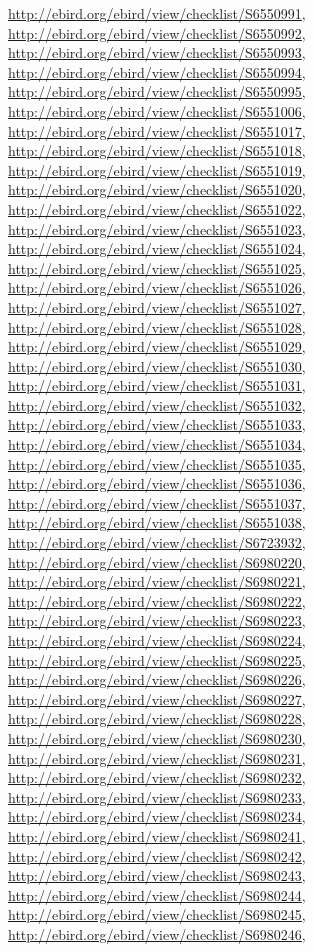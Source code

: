 \documentclass[9pt, article]{memoir}
\begin{document}
\begin{multicols}{2}
\url{http://ebird.org/ebird/view/checklist/S6550991}, 
\url{http://ebird.org/ebird/view/checklist/S6550992}, 
\url{http://ebird.org/ebird/view/checklist/S6550993}, 
\url{http://ebird.org/ebird/view/checklist/S6550994}, 
\url{http://ebird.org/ebird/view/checklist/S6550995}, 
\url{http://ebird.org/ebird/view/checklist/S6551006}, 
\url{http://ebird.org/ebird/view/checklist/S6551017}, 
\url{http://ebird.org/ebird/view/checklist/S6551018}, 
\url{http://ebird.org/ebird/view/checklist/S6551019}, 
\url{http://ebird.org/ebird/view/checklist/S6551020}, 
\url{http://ebird.org/ebird/view/checklist/S6551022}, 
\url{http://ebird.org/ebird/view/checklist/S6551023}, 
\url{http://ebird.org/ebird/view/checklist/S6551024}, 
\url{http://ebird.org/ebird/view/checklist/S6551025}, 
\url{http://ebird.org/ebird/view/checklist/S6551026}, 
\url{http://ebird.org/ebird/view/checklist/S6551027}, 
\url{http://ebird.org/ebird/view/checklist/S6551028}, 
\url{http://ebird.org/ebird/view/checklist/S6551029}, 
\url{http://ebird.org/ebird/view/checklist/S6551030}, 
\url{http://ebird.org/ebird/view/checklist/S6551031}, 
\url{http://ebird.org/ebird/view/checklist/S6551032}, 
\url{http://ebird.org/ebird/view/checklist/S6551033}, 
\url{http://ebird.org/ebird/view/checklist/S6551034}, 
\url{http://ebird.org/ebird/view/checklist/S6551035}, 
\url{http://ebird.org/ebird/view/checklist/S6551036}, 
\url{http://ebird.org/ebird/view/checklist/S6551037}, 
\url{http://ebird.org/ebird/view/checklist/S6551038}, 
\url{http://ebird.org/ebird/view/checklist/S6723932}, 
\url{http://ebird.org/ebird/view/checklist/S6980220}, 
\url{http://ebird.org/ebird/view/checklist/S6980221}, 
\url{http://ebird.org/ebird/view/checklist/S6980222}, 
\url{http://ebird.org/ebird/view/checklist/S6980223}, 
\url{http://ebird.org/ebird/view/checklist/S6980224}, 
\url{http://ebird.org/ebird/view/checklist/S6980225}, 
\url{http://ebird.org/ebird/view/checklist/S6980226}, 
\url{http://ebird.org/ebird/view/checklist/S6980227}, 
\url{http://ebird.org/ebird/view/checklist/S6980228}, 
\url{http://ebird.org/ebird/view/checklist/S6980230}, 
\url{http://ebird.org/ebird/view/checklist/S6980231}, 
\url{http://ebird.org/ebird/view/checklist/S6980232}, 
\url{http://ebird.org/ebird/view/checklist/S6980233}, 
\url{http://ebird.org/ebird/view/checklist/S6980234}, 
\url{http://ebird.org/ebird/view/checklist/S6980241}, 
\url{http://ebird.org/ebird/view/checklist/S6980242}, 
\url{http://ebird.org/ebird/view/checklist/S6980243}, 
\url{http://ebird.org/ebird/view/checklist/S6980244}, 
\url{http://ebird.org/ebird/view/checklist/S6980245}, 
\url{http://ebird.org/ebird/view/checklist/S6980246}, 

\end{multicols}
\end{document}
